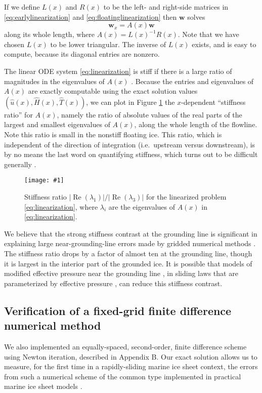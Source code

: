 \documentclass[twocolumn]{igs}
\newcommand{\onecol}[1]{\texttt{[image: \#1]}}
\newcommand{\bw}{\mathbf{w}}
\newcommand{\hu}{\hat u}
\newcommand{\hH}{\hat H}
\newcommand{\hT}{\hat T}
\begin{document}
If we define $L(x)$ and $R(x)$ to be the left- and right-side matrices in \eqref{eq:earlylinearization} and \eqref{eq:floatinglinearization} then $\bw$ solves
\begin{equation}
\bw_x = A(x) \bw \label{eq:linearization}
\end{equation}
along its whole length, where $A(x) = L(x)^{-1} R(x)$.  Note that we have chosen $L(x)$ to be lower triangular.  The inverse of $L(x)$ exists, and is easy to compute, because its diagonal entries are nonzero.

The linear ODE system \eqref{eq:linearization} is stiff if there is a large ratio of magnitudes in the eigenvalues of $A(x)$ \citep{Pressetal}.  Because the entries and eigenvalues of $A(x)$ are exactly computable using the exact solution values $(\hu(x),\hH(x),\hT(x))$, we can plot in Figure \ref{fig:stiffness} the $x$-dependent ``stiffness ratio'' for $A(x)$, namely the ratio of absolute values of the real parts of the largest and smallest eigenvalues of $A(x)$, along the whole length of the flowline.  Note this ratio is small in the nonstiff floating ice.  This ratio, which is independent of the direction of integration (i.e.~upstream versus downstream), is by no means the last word on quantifying stiffness, which turns out to be difficult generally \citep[e.g.][]{HighamTrefethen1993}.

\begin{figure}[ht]
\onecol{em-stiffness-ratio}
\caption{Stiffness ratio $|\operatorname{Re}(\lambda_1)|/|\operatorname{Re}(\lambda_3)|$ for the linearized problem \eqref{eq:linearization}, where $\lambda_i$ are the eigenvalues of $A(x)$ in \eqref{eq:linearization}.} \label{fig:stiffness}
\end{figure}

We believe that the strong stiffness contrast at the grounding line is significant in explaining large near-grounding-line errors made by gridded numerical methods \citep{Gladstoneetal2010,MISMIP2012}.  The stiffness ratio drops by a factor of almost ten at the grounding line, though it is largest in the interior part of the grounded ice.  It is possible that models of modified effective pressure near the grounding line \citep{Leguyetal2014}, in sliding laws that are parameterized by effective pressure \citep{Schoof2005cavitation}, can reduce this stiffness contrast.

\subsection*{Verification of a fixed-grid finite difference numerical method}  We also implemented an equally-spaced, second-order, finite difference scheme using Newton iteration, described in Appendix B.  Our exact solution allows us to measure, for the first time in a rapidly-sliding marine ice sheet context, the errors from such a numerical scheme of the common type implemented in practical marine ice sheet models \citep[e.g.][]{PollardDeConto2009WAIS,Winkelmannetal2011}.
\end{document}
